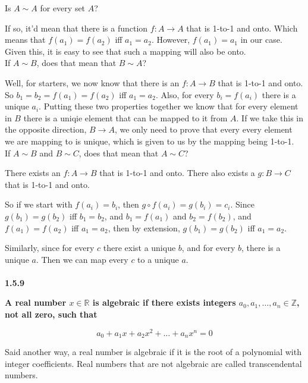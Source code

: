 Is $A \sim A$ for every set $A$?

If so, it'd mean that there is a function $f: A \rightarrow A$ that is 1-to-1 and onto.
Which means that $f(a_1) = f(a_2)$ iff $a_1 = a_2$.
However, $f(a_1) = a_1$ in our case.
Given this, it is easy to see that such a mapping will also be onto.
\\

If $A\sim B$, does that mean that $B\sim A$?

Well, for starters, we now know that there is an $f: A\rightarrow B$ that is 1-to-1 and onto.
So $b_1 = b_2 = f(a_1) = f(a_2)$ iff $a_1 = a_2$.
Also, for every $b_i = f(a_i)$ there is a unique $a_i$.
Putting these two properties together we know that for every element in $B$ there is a uniqie element
that can be mapped to it from $A$.
If we take this in the opposite direction, $B\rightarrow A$, we only need to prove that every every element we are mapping to
is unique, which is given to us by the mapping being 1-to-1.
\\

If $A\sim B$ and $B\sim C$, does that mean that $A\sim C$?

There exists an $f: A\rightarrow B$ that is 1-to-1 and onto.
There also exists a $g: B \rightarrow C$ that is 1-to-1 and onto.

So if we start with $f(a_i) = b_i$, then $g \circ f (a_i) = g(b_i) = c_i$.
Since $g(b_1) = g(b_2)$ iff $b_1 = b_2$, and $b_1 = f(a_1)$ and $b_2 = f(b_2)$, and $f(a_1) = f(a_2)$ iff $a_1 = a_2$,
then by extension, $g(b_1) = g(b_2)$ iff $a_1 = a_2$.

Similarly, since for every $c$ there exist a unique $b$, and for every $b$, there is a unique $a$.
Then we can map every $c$ to a unique $a$.
\\~\\



\textbf{1.5.9}

\textbf{A real number $x\in \mathbb{R}$ is algebraic if there exists integers $a_0, a_1,\dots ,a_n \in \mathbb{Z}$,
not all zero, such that}

\begin{equation}
    a_0 + a_1 x + a_2 x^2 + \ldots + a_n x^n = 0
\end{equation}

Said another way, a real number is algebraic if it is the root of a polynomial with integer coefficients.
Real numbers that are not algebraic are called transcendental numbers.

